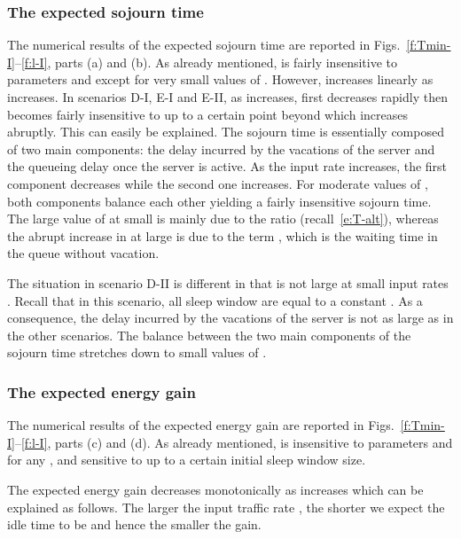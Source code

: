 \documentclass[journal]{IEEEtran}
\begin{document}
\subsubsection{The expected sojourn time }
\label{s:T}
The numerical results of the expected sojourn time  are reported in Figs.~\ref{f:Tmin-I}--\ref{f:l-I}, parts (a) and (b). As already mentioned,  is fairly insensitive to parameters  and  except
for very small values of . However,  increases linearly as  increases. In scenarios D-I, E-I and E-II, as  increases,  first decreases rapidly then becomes fairly insensitive to  up to a certain point beyond which  increases abruptly. This can easily be explained. The sojourn time is essentially composed of two main components: the delay incurred by the vacations of the server and the queueing delay once the server is active. As the input rate increases, the first component decreases while the second one increases. For moderate values of , both components balance each other yielding a fairly insensitive sojourn time. The large value of  at small  is mainly due to the ratio  (recall~\eqref{e:T-alt}), whereas the abrupt increase in  at large  is due to the term , which is the waiting time in the  queue without vacation.

The situation in scenario D-II is different in that  is not large at small input rates . Recall that in this scenario, all sleep window are equal to a constant . As a consequence, the delay incurred by the vacations of the server is not as large as in the other scenarios. The balance between the two main components of the sojourn time stretches down to small values of .
\subsubsection{The expected energy gain }
\label{s:G}
The numerical results of the expected energy gain  are reported in Figs.~\ref{f:Tmin-I}--\ref{f:l-I}, parts (c) and (d). As already mentioned,  is insensitive to parameters  and  for any , and sensitive to  up to a certain initial sleep window size. 

The expected energy gain  decreases monotonically as  increases which can be explained as follows. The larger the input traffic rate , the shorter we expect the idle time to be and hence the smaller the gain.
\end{document}
